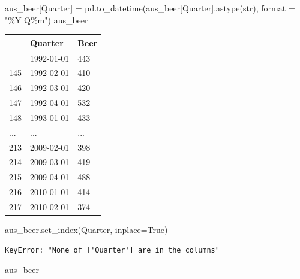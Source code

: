 \documentclass[
  11pt,
]{article}
\newenvironment{Shaded}{\begin{snugshade}}{\end{snugshade}}
\newcommand{\BuiltInTok}[1]{\textcolor[rgb]{0.00,0.23,0.31}{#1}}
\newcommand{\NormalTok}[1]{\textcolor[rgb]{0.00,0.23,0.31}{#1}}
\newcommand{\OperatorTok}[1]{\textcolor[rgb]{0.37,0.37,0.37}{#1}}
\newcommand{\StringTok}[1]{\textcolor[rgb]{0.13,0.47,0.30}{#1}}
\newcommand{\VariableTok}[1]{\textcolor[rgb]{0.07,0.07,0.07}{#1}}
\begin{document}
\begin{Shaded}
\begin{Highlighting}[]

\NormalTok{aus\_beer[}\StringTok{\textquotesingle{}Quarter\textquotesingle{}}\NormalTok{] }\OperatorTok{=}\NormalTok{ pd.to\_datetime(aus\_beer[}\StringTok{\textquotesingle{}Quarter\textquotesingle{}}\NormalTok{].astype(}\BuiltInTok{str}\NormalTok{), }\BuiltInTok{format} \OperatorTok{=} \StringTok{"\%Y Q\%m"}\NormalTok{)}
\NormalTok{aus\_beer}
\end{Highlighting}
\end{Shaded}

\begin{longtable}[]{@{}lll@{}}
\toprule\noalign{}
& Quarter & Beer \\
\midrule\noalign{}
\endhead
\bottomrule\noalign{}
\endlastfoot
144 & 1992-01-01 & 443 \\
145 & 1992-02-01 & 410 \\
146 & 1992-03-01 & 420 \\
147 & 1992-04-01 & 532 \\
148 & 1993-01-01 & 433 \\
... & ... & ... \\
213 & 2009-02-01 & 398 \\
214 & 2009-03-01 & 419 \\
215 & 2009-04-01 & 488 \\
216 & 2010-01-01 & 414 \\
217 & 2010-02-01 & 374 \\
\end{longtable}

\begin{Shaded}
\begin{Highlighting}[]
\NormalTok{aus\_beer.set\_index(}\StringTok{\textquotesingle{}Quarter\textquotesingle{}}\NormalTok{, inplace}\OperatorTok{=}\VariableTok{True}\NormalTok{)}
\end{Highlighting}
\end{Shaded}

\begin{verbatim}
KeyError: "None of ['Quarter'] are in the columns"
\end{verbatim}

\begin{Shaded}
\begin{Highlighting}[]

\NormalTok{aus\_beer}
\end{Highlighting}
\end{Shaded}
\end{document}
